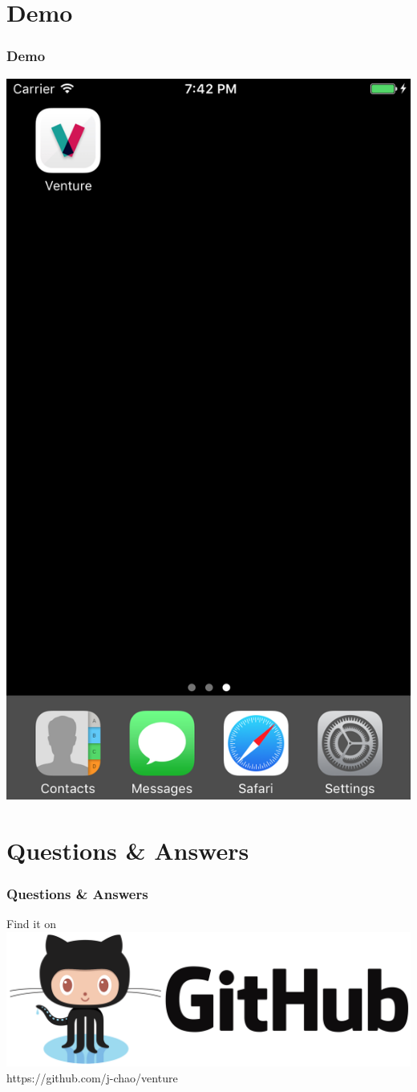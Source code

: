 \documentclass{beamer}
\begin{document}
\section{Demo}
\begin{frame}
\frametitle{Demo}
    \begin{center}
        \includegraphics[scale=0.33]{home}
    \end{center}
\end{frame}

\section{Questions \& Answers}
\begin{frame}
\frametitle{Questions \& Answers}
    \begin{center}
        Find it on \\
        \includegraphics[scale=0.14]{github} \\
        https://github.com/j-chao/venture
    \end{center}
\end{frame}
\end{document}
